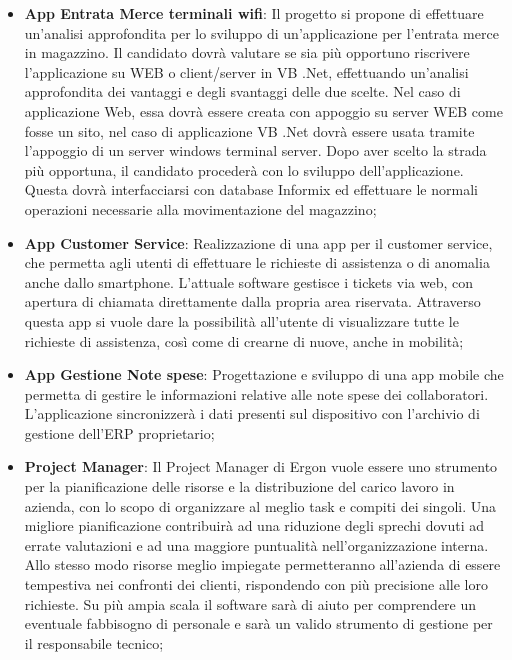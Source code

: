 \begin{itemize}
	
	\item \textbf{App Entrata Merce terminali wifi}: Il progetto si propone di effettuare un'analisi approfondita per lo sviluppo di un'applicazione per l’entrata merce in magazzino.
	Il candidato dovrà valutare se sia più opportuno riscrivere l’applicazione su WEB o
	client/server in VB .Net, effettuando un’analisi approfondita dei vantaggi e degli
	svantaggi delle due scelte.
	Nel caso di applicazione Web, essa dovrà essere creata con appoggio su server WEB
	come fosse un sito, nel caso di applicazione VB .Net dovrà essere usata tramite
	l’appoggio di un server windows terminal server. Dopo aver scelto la strada più
	opportuna, il candidato procederà con lo sviluppo dell’applicazione. Questa dovrà
	interfacciarsi con database Informix ed effettuare le normali operazioni necessarie alla
	movimentazione del magazzino;
	
	\item \textbf{App Customer Service}: Realizzazione di una app per il customer service, che permetta agli utenti di effettuare le richieste di assistenza o di anomalia anche dallo smartphone. L’attuale software gestisce i tickets via web, con apertura di chiamata direttamente dalla propria area	riservata. Attraverso questa app si vuole dare la possibilità all’utente di visualizzare tutte le richieste di assistenza, così come di crearne di nuove, anche in mobilità;
	
	\item \textbf{App Gestione Note spese}: Progettazione e sviluppo di una app mobile che permetta di gestire le informazioni	relative alle note spese dei collaboratori. L’applicazione sincronizzerà i dati presenti sul dispositivo con l’archivio di gestione dell’ERP proprietario;
	
	\item \textbf{Project Manager}: Il Project Manager di Ergon vuole essere uno strumento per la pianificazione delle
	risorse e la distribuzione del carico lavoro in azienda, con lo scopo di organizzare al
	meglio task e compiti dei singoli.
	Una migliore pianificazione contribuirà ad una riduzione degli sprechi dovuti ad errate
	valutazioni e ad una maggiore puntualità nell’organizzazione interna. Allo stesso modo
	risorse meglio impiegate permetteranno all’azienda di essere tempestiva nei confronti
	dei clienti, rispondendo con più precisione alle loro richieste. Su più ampia scala il
	software sarà di aiuto per comprendere un eventuale fabbisogno di personale e sarà
	un valido strumento di gestione per il responsabile tecnico;
	

\end{itemize}
